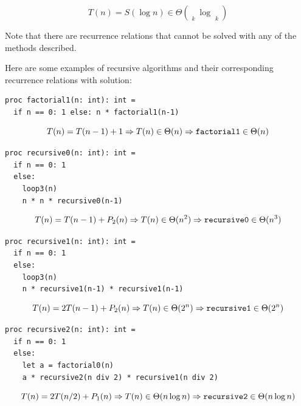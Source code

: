 \documentclass[justified, sixbynine]{tufte-book}
\def\stackunder#1#2{\mathrel{\mathop{#2}\limits_{#1}}}
\theoremstyle{plain}%
\newtheorem * {corollary}{Corollary}
\theoremstyle{definition}
\theoremstyle{remark}
\newtheorem * {remark}{Remark}
\newtheorem * {note}{Note}
\begin{document}
\begin{fullwidth}
\begin{equation}
T(n)=S(\log n)\in \Theta (\stackunder{k}{\underbrace{\log n}}\log
\stackunder{k}{\underbrace{\log n}})
\end{equation}

Note that there are recurrence relations that cannot be solved with any of
the methods described.

Here are some examples of recursive algorithms and their corresponding recurrence relations with solution:

\begin{lstlisting}
proc factorial1(n: int): int =
  if n == 0: 1 else: n * factorial1(n-1)
\end{lstlisting}

\begin{equation}
T(n)=T(n-1)+1\Rightarrow T(n)\in \Theta (n)\Rightarrow \text{{\tt factorial1}%
}\in \Theta (n)
\end{equation}

\begin{lstlisting}
proc recursive0(n: int): int =
  if n == 0: 1
  else:
    loop3(n)
    n * n * recursive0(n-1)
\end{lstlisting}

\begin{equation}
T(n)=T(n-1)+P_2(n)\Rightarrow T(n)\in \Theta (n^2)\Rightarrow \text{{\tt %
recursive0}}\in \Theta (n^3)
\end{equation}

\begin{lstlisting}
proc recursive1(n: int): int =
  if n == 0: 1
  else:
    loop3(n)
    n * recursive1(n-1) * recursive1(n-1)
\end{lstlisting}

\begin{equation}
T(n)=2T(n-1)+P_2(n)\Rightarrow T(n)\in \Theta (2^n)\Rightarrow \text{{\tt %
recursive1}}\in \Theta (2^n)
\end{equation}

\begin{lstlisting}
proc recursive2(n: int): int =
  if n == 0: 1
  else:
    let a = factorial0(n)
    a * recursive2(n div 2) * recursive1(n div 2)
\end{lstlisting}

\begin{equation}
T(n) = 2 T(n/2) + P_1(n) \Rightarrow T(n)\in \Theta (n\log n)\Rightarrow \text{%
{\tt recursive2}}\in \Theta (n\log n)
\end{equation}


\end{fullwidth}
\end{document}
